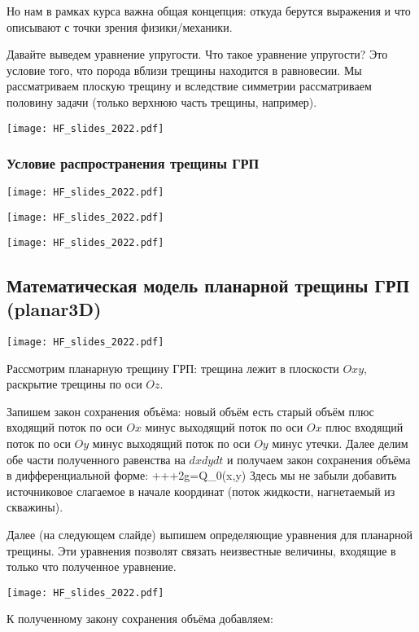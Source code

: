\documentclass[main.tex]{subfiles}
\begin{document}
Но нам в рамках курса важна общая концепция: откуда берутся выражения и что описывают с точки зрения физики/механики.

Давайте выведем уравнение упругости.
Что такое уравнение упругости?
Это условие того, что порода вблизи трещины находится в равновесии.
Мы рассматриваем плоскую трещину и вследствие симметрии рассматриваем половину задачи (только верхнюю часть трещины, например).

\texttt{[image: HF\_slides\_2022.pdf]}

\subsubsection{Условие распространения трещины ГРП}

\texttt{[image: HF\_slides\_2022.pdf]}

\texttt{[image: HF\_slides\_2022.pdf]}

\texttt{[image: HF\_slides\_2022.pdf]}

\subsection{Математическая модель планарной трещины ГРП (planar3D)}

\texttt{[image: HF\_slides\_2022.pdf]}

Рассмотрим планарную трещину ГРП: трещина лежит в плоскости $Oxy$, раскрытие трещины по оси $Oz$.

Запишем закон сохранения объёма: новый объём есть старый объём плюс входящий поток по оси $Ox$ минус выходящий поток по оси $Ox$ плюс входящий поток по оси $Oy$ минус выходящий поток по оси $Oy$ минус утечки.
Далее делим обе части полученного равенства на $dxdydt$ и получаем закон сохранения объёма в дифференциальной форме:
\beq
{}+++2g=Q_0\delta(x,y)
\eeq
Здесь мы не забыли добавить источниковое слагаемое в начале координат (поток жидкости, нагнетаемый из скважины).

Далее (на следующем слайде) выпишем определяющие уравнения для планарной трещины.
Эти уравнения позволят связать неизвестные величины, входящие в только что полученное уравнение.

\texttt{[image: HF\_slides\_2022.pdf]}

К полученному закону сохранения объёма добавляем:
\end{document}
